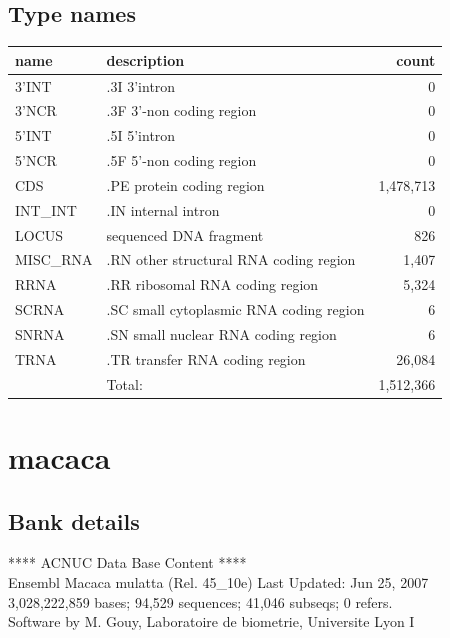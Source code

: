 \documentclass{article}
\begin{document}
\begin{Schunk}
\subsection{Type names}
\noindent\begin{tabular}{llr}
\hline \hline
name & description & count \\
\hline
3'INT  &  .3I 3'intron  &  0 \\
3'NCR  &  .3F  3'-non coding region  &  0 \\
5'INT  &  .5I 5'intron  &  0 \\
5'NCR  &  .5F  5'-non coding region  &  0 \\
CDS  &  .PE protein coding region  &  1,478,713 \\
INT\_INT  &  .IN  internal intron  &  0 \\
LOCUS  &  sequenced DNA fragment  &  826 \\
MISC\_RNA  &  .RN other structural RNA coding region  &  1,407 \\
RRNA  &  .RR ribosomal RNA coding region  &  5,324 \\
SCRNA  &  .SC small cytoplasmic RNA coding region  &  6 \\
SNRNA  &  .SN small nuclear RNA coding region  &  6 \\
TRNA  &  .TR transfer RNA coding region  &  26,084 \\
\hline
 & Total: & 1,512,366 \\
\hline \hline
\end{tabular}

\section{ macaca }
\subsection{Bank details}
             ****     ACNUC Data Base Content      ****                         \\
        Ensembl Macaca mulatta (Rel. 45\_10e) Last Updated: Jun 25, 2007\\
3,028,222,859 bases; 94,529 sequences; 41,046 subseqs; 0 refers.\\
Software by M. Gouy, Laboratoire de biometrie, Universite Lyon I 


\end{Schunk}
\end{document}
